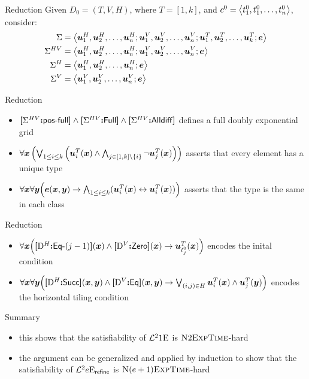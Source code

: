 \documentclass{beamer}
\begin{document}
\begin{frame}{Reduction}
Given $D_0 = (T,V,H)$, where $T = [1,k]$, and $c^0 =
\left\langle t_1^0,t_1^0,\dots,t_n^0 \right\rangle$, consider:
\begin{align*}
\Sigma &=
\left\langle \bm{u}_{1}^H,\bm{u}_{2}^H,\dots,\bm{u}_{n}^H;\bm{u}_{1}^V,\bm{u}_{2}^V,\dots,\bm{u}_{n}^V;
\bm{u}_{1}^T,\bm{u}_{2}^T,\dots,\bm{u}_{k}^T;\bm{e} \right\rangle \\
\Sigma^{HV} &=
\left\langle \bm{u}_{1}^H,\bm{u}_{2}^H,\dots,\bm{u}_{n}^H;\bm{u}_{1}^V,\bm{u}_{2}^V,\dots,\bm{u}_{n}^V;\bm{e} \right\rangle \\
\Sigma^{H} &=
\left\langle \bm{u}_{1}^H,\bm{u}_{2}^H,\dots,\bm{u}_{n}^H;\bm{e} \right\rangle \\
\Sigma^{V} &=
\left\langle \bm{u}_{1}^V,\bm{u}_{2}^V,\dots,\bm{u}_{n}^V;\bm{e} \right\rangle
\end{align*}
\end{frame}

\begin{frame}{Reduction}
\begin{itemize}
  \item
  ${\bm{[}\Sigma^{HV}\mathord{\bm{:}}\mathsf{pos}{\hbox{-}}\mathsf{full}\bm{]}}\land{\bm{[}\Sigma^{HV}\mathord{\bm{:}}\mathsf{Full}\bm{]}}\land{\bm{[}\Sigma^{HV}\mathord{\bm{:}}\mathsf{Alldiff}\bm{]}}$
  defines a full doubly exponential grid
  \item $
      \forall\bm{x} \left(\bigvee_{1 \leq i \leq k} \left(\bm{u}_{i}^{T}(\bm{x})
  \land \bigwedge_{j\in[1,k]\setminus\left\{i\right\}}
  \lnot\bm{u}_{j}^{T}(\bm{x})\right)\right)$ asserts that every element has a
  unique type
  \item $\forall\bm{x}\forall\bm{y} \Big(\bm{e}(\bm{x},\bm{y}) \rightarrow
  \bigwedge_{1 \leq i \leq k} 
  (\bm{u}_{i}^{T}(\bm{x}) \leftrightarrow \bm{u}_{i}^{T}(\bm{x}))\Big)$ asserts that the type is
  the same in each class
\end{itemize}
\end{frame}

\begin{frame}{Reduction}
\begin{itemize}
  \item $\forall\bm{x} \Big({\bm{[}{\mathrm{D}}^H\mathord{\bm{:}}\mathsf{Eq}{\hbox{-}}(j-1)\bm{]}}(\bm{x}) \land {\bm{[}{\mathrm{D}}^V\mathord{\bm{:}}\mathsf{Zero}\bm{]}}(\bm{x})
  \rightarrow \bm{u}_{t_{j}^0}^{T}(\bm{x})\Big)$ encodes the inital condition
  \item $\forall\bm{x}\forall\bm{y} \Big({\bm{[}{\mathrm{D}}^H\mathord{\bm{:}}\mathsf{Succ}\bm{]}}(\bm{x},\bm{y}) \land
  {\bm{[}{\mathrm{D}}^V\mathord{\bm{:}}\mathsf{Eq}\bm{]}}(\bm{x},\bm{y}) \rightarrow
  \bigvee_{(i,j) \in H} \bm{u}_{i}^{T}(\bm{x}) \land
  \bm{u}_{j}^{T}(\bm{y})\Big)$ encodes the horizontal tiling condition
\end{itemize}
\end{frame}

\begin{frame}{Summary}
\begin{itemize}
  \item
  this shows that the satisfiability of $\mathcal{L}^{2}{1}\mathrm{E}_{{}}$ is $\text{\normalfont{\scshape N}}2\text{\normalfont{\scshape ExpTime}}$-hard
  
  \item
  the argument can be generalized and applied by induction to show that 
  the satisfiability of $\mathcal{L}^{2}{e}\mathrm{E}_{\mathsf{refine}}$ is $\text{\normalfont{\scshape N}}(e+1)\text{\normalfont{\scshape ExpTime}}$-hard
\end{itemize}
\end{frame}
\end{document}
